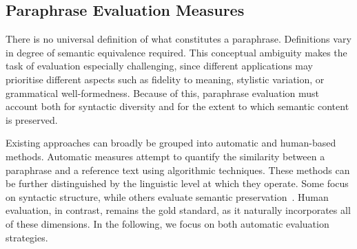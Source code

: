 
\subsection{Paraphrase Evaluation Measures}
\label{subsec:paraphrase_evaluation}

There is no universal definition of what constitutes a paraphrase. 
Definitions vary in degree of semantic equivalence required. 
This conceptual ambiguity makes the task of evaluation especially challenging, since different applications may prioritise different aspects such as fidelity to meaning, stylistic variation, or grammatical well-formedness.
Because of this, paraphrase evaluation must account both for syntactic diversity and for the extent to which semantic content is preserved. 

Existing approaches can broadly be grouped into automatic and human-based methods. 
Automatic measures attempt to quantify the similarity between a paraphrase and a reference text using algorithmic techniques. 
These methods can be further distinguished by the linguistic level at which they operate. 
Some focus on syntactic structure, while others evaluate semantic preservation~\citep{gohsen_captions_2023}. 
Human evaluation, in contrast, remains the gold standard, as it naturally incorporates all of these dimensions.
In the following, we focus on both automatic evaluation strategies. 





